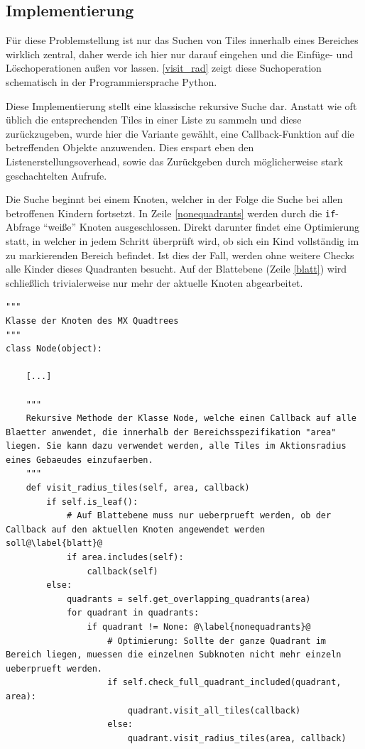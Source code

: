 \documentclass[%
			paper=a4,%
			DIV12,
			liststotoc,
			bibtotoc,
			draft=false,%
			titlepage,
			numbers=noendperiod
			]{scrartcl}
\newcommand{\inlinecode}[1]{\mbox{\texttt{#1}}}
\begin{document}
\subsection{Implementierung}

Für diese Problemstellung ist nur das Suchen von Tiles innerhalb eines Bereiches wirklich zentral, daher werde ich hier nur darauf eingehen und die Einfüge- und Löschoperationen außen vor lassen.
\lstlistingname{} \ref{visit_rad} zeigt diese Suchoperation schematisch in der Programmiersprache Python.

Diese Implementierung stellt eine klassische rekursive Suche dar. 
Anstatt wie oft üblich die entsprechenden Tiles in einer Liste zu sammeln und diese zurückzugeben, wurde hier die Variante gewählt, eine Callback-Funktion auf die betreffenden Objekte anzuwenden. Dies erspart eben den Listenerstellungsoverhead, sowie das Zurückgeben durch möglicherweise stark geschachtelten Aufrufe.

Die Suche beginnt bei einem Knoten, welcher in der Folge die Suche bei allen betroffenen Kindern fortsetzt.
In Zeile \ref{nonequadrants} werden durch die \inlinecode{if}-Abfrage "`weiße"' Knoten ausgeschlossen.
Direkt darunter findet eine Optimierung statt, in welcher in jedem Schritt überprüft wird, ob sich ein Kind vollständig im zu markierenden Bereich befindet.
Ist dies der Fall, werden ohne weitere Checks alle Kinder dieses Quadranten besucht.
Auf der Blattebene (Zeile \ref{blatt}) wird schließlich trivialerweise nur mehr der aktuelle Knoten abgearbeitet.

\begin{lstlisting}[float=h,caption=Python-ähnlicher Pseudocode zur Lösung des Markierungsproblems,label=visit_rad]
"""
Klasse der Knoten des MX Quadtrees
"""
class Node(object):

	[...]

	"""
	Rekursive Methode der Klasse Node, welche einen Callback auf alle Blaetter anwendet, die innerhalb der Bereichsspezifikation "area" liegen. Sie kann dazu verwendet werden, alle Tiles im Aktionsradius eines Gebaeudes einzufaerben.
	"""
	def visit_radius_tiles(self, area, callback)
		if self.is_leaf():
			# Auf Blattebene muss nur ueberprueft werden, ob der Callback auf den aktuellen Knoten angewendet werden soll@\label{blatt}@
			if area.includes(self):
				callback(self)
		else:
			quadrants = self.get_overlapping_quadrants(area)
			for quadrant in quadrants:
				if quadrant != None: @\label{nonequadrants}@
					# Optimierung: Sollte der ganze Quadrant im Bereich liegen, muessen die einzelnen Subknoten nicht mehr einzeln ueberprueft werden.
					if self.check_full_quadrant_included(quadrant, area):
						quadrant.visit_all_tiles(callback)
					else:
						quadrant.visit_radius_tiles(area, callback)
\end{lstlisting}
\end{document}
